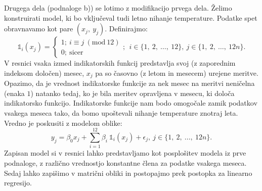 \documentclass{article}
\begin{document}
Drugega dela (podnaloge b)) se lotimo z modifikacijo prvega dela. Želimo konstruirati model, ki bo vključeval tudi letno nihanje temperature. 
Podatke spet obravnavamo kot pare $(x_j,~y_j)$. Definirajmo:
$$
\mathds{1}_i(x_j)= \begin{cases}
    1;~ i \equiv j~(\text{mod}~12) \\
    0;~\text{sicer}
\end{cases};~~i \in \{1,~2,~\dots,~12\},~j \in \{1,~2,~\dots,~12n\}.
$$
V resnici vsaka izmed indikatorskih funkcij predstavlja svoj (z zaporednim indeksom določen) mesec, $x_j$ pa so časovno (z letom in mesecem) urejene meritve. 
Opazimo, da je vrednost indikatorske funkcije za nek mesec na meritvi neničelna (enaka $1$) natanko tedaj, ko je bila meritev opravljena v mesecu, ki določa indikatorsko funkcijo.
Indikatorske funkcije nam bodo omogočale zamik podatkov vsakega meseca tako, da bomo upoštevali nihanje temperature znotraj leta. 
Vredno je poskusiti z modelom oblike:
$$
    y_j = \beta_0 x_j + \sum_{i=1}^{12}{\beta_{i}~\mathds{1}_i(x_j)} + \epsilon_j,~j \in \{1,~2,~\dots,~12n\}.
$$
Zapisan model si v resnici lahko predstavljamo kot posplošitev modela iz prve podnaloge, z različno vrednostjo konstantne člena za podatke vsakega meseca. 
\newline
\newline
Sedaj lahko zapišimo v  matrični obliki in postopajmo prek postopka za linearno regresijo. 
\end{document}
